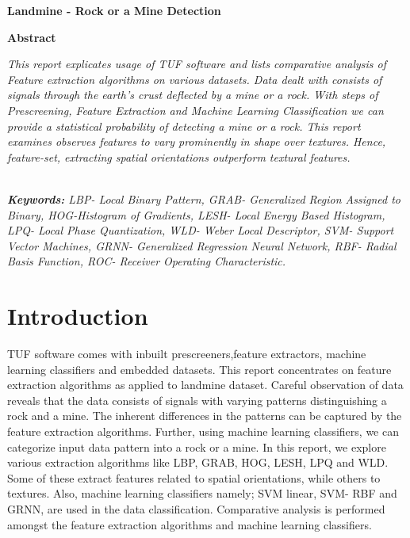 \documentclass[english, 12pt]{article}
\begin{document}
\newcommand\tab[1][1cm]{\hspace*{#1}}
\newcommand\spacet[1][1cm]

\title{\textbf{Landmine - Rock or a Mine Detection}}
\author{
	\begin{large}
		Landmine group
	\end{large} \\
		Biometrics and Machine Learning Lab\\
		University of Florida
	}
\date{\today}
\maketitle

\begin{Large}
	\begin{center}
		\textbf{Abstract} 
	\end{center}
	\end{Large}
\begin{large}
\textit{\tab This report explicates usage of TUF software and lists comparative analysis of Feature extraction algorithms on various datasets. Data dealt with consists of signals through the earth's crust deflected by a mine or a rock. With steps of Prescreening, Feature Extraction and Machine Learning Classification we can provide a statistical probability of detecting a mine or a rock. This report examines observes features to vary prominently in shape over textures. Hence, feature-set, extracting spatial orientations outperform textural features.}
\end{large} 
\\

\textit{\textbf{Keywords:}  LBP- Local Binary Pattern, GRAB- Generalized Region Assigned to Binary, HOG-Histogram of Gradients, LESH- Local Energy Based Histogram, LPQ- Local Phase Quantization, WLD- Weber Local Descriptor, SVM- Support Vector Machines, GRNN- Generalized Regression Neural Network, RBF- Radial Basis Function, ROC- Receiver Operating Characteristic.} 

\section{Introduction}
\tab TUF software comes with inbuilt prescreeners,feature extractors, machine learning classifiers and embedded datasets. This report concentrates on feature extraction algorithms as applied to landmine dataset. Careful observation of data reveals that the data consists of signals with varying patterns distinguishing a rock and a mine. The inherent differences in the patterns can be captured by the feature extraction algorithms. Further, using machine learning classifiers, we can categorize input data pattern into a rock or a mine. In this report, we explore various extraction algorithms like LBP, GRAB, HOG, LESH, LPQ and WLD. Some of these extract features related to spatial orientations, while others to textures. Also, machine learning classifiers namely; SVM linear, SVM- RBF and GRNN, are used in the data classification. Comparative analysis is performed amongst the feature extraction algorithms and machine learning classifiers.
\end{document}

